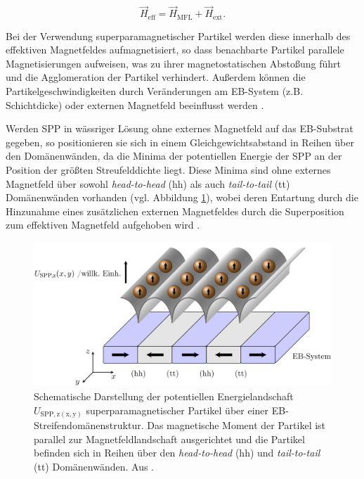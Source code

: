 \documentclass[page,pdftex,12pt,a4paper,twoside,openright]{scrbook}
\begin{document}
\begin{equation}
\vec{H}_\mathrm{eff} = \vec{H}_\mathrm{MFL} + \vec{H}_\mathrm{ext}.
\end{equation}

Bei der Verwendung superparamagnetischer Partikel werden diese innerhalb des effektiven Magnetfeldes aufmagnetisiert, so dass benachbarte Partikel parallele Magnetisierungen aufweisen, was zu ihrer magnetostatischen Abstoßung führt und die Agglomeration der Partikel verhindert. Außerdem können die Partikelgeschwindigkeiten durch Veränderungen am EB-System (z.B. Schichtdicke) oder externen Magnetfeld beeinflusst werden \cite{holzinger_directed_2015}.

Werden SPP in wässriger Lösung ohne externes Magnetfeld auf das EB-Substrat gegeben, so positionieren sie sich in einem Gleichgewichtsabstand in Reihen über den Domänenwänden, da die Minima der potentiellen Energie der SPP an der Position der größten Streufelddichte liegt. Diese Minima sind ohne externes Magnetfeld über sowohl \emph{head-to-head} (hh) als auch \emph{tail-to-tail} (tt) Domänenwänden vorhanden (vgl. Abbildung \ref{fig-mfl}), wobei deren Entartung durch die Hinzunahme eines zusätzlichen externen Magnetfeldes durch die Superposition zum effektiven Magnetfeld aufgehoben wird \cite{holzinger_directed_2015}.

\begin{figure}[h]
\centering
\includegraphics[width=\textwidth]{img/mfl.png}
\caption{\label{fig-mfl}
Schematische Darstellung der potentiellen Energielandschaft \(U_\mathrm{SPP,z(x,y)}\) superparamagnetischer Partikel über einer EB-Streifendomänenstruktur. Das magnetische Moment der Partikel ist parallel zur Magnetfeldlandschaft ausgerichtet und die Partikel befinden sich in Reihen über den \emph{head-to-head} (hh) und \emph{tail-to-tail} (tt) Domänenwänden. Aus \cite{holzinger_transport_2015}.}
\end{figure}
\end{document}
